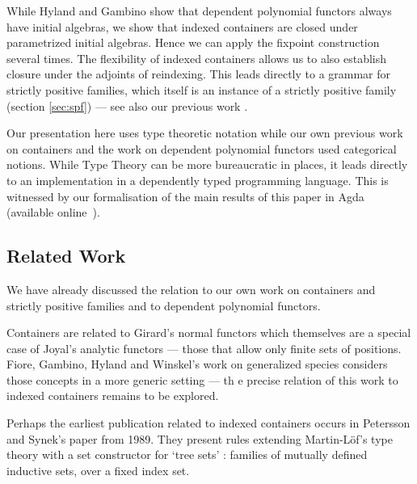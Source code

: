 \documentclass[10pt, conference, compsocconf]{IEEEtran}
\begin{document}
While Hyland and Gambino \cite{HylandGambino} show that dependent polynomial 
functors always
have initial algebras, we show that indexed containers are closed under 
parametrized initial algebras. Hence we can apply the fixpoint
construction several times. The flexibility of indexed
containers allows us to also establish closure under the adjoints of
reindexing. This leads directly to a grammar for strictly positive
families, which itself is an instance of a strictly positive family 
(section \ref{sec:spf}) --- see also our previous work \cite{alti:cats07,alti:jcats07}.

Our presentation here uses type theoretic notation while our own
previous work on containers and the work on dependent polynomial functors used
categorical notions. While Type Theory can be more bureaucratic in places, it
leads directly to an implementation in a dependently typed programming
language. This is witnessed by our formalisation of the main results
of this paper in Agda (available online~\cite{agdaform}).


\subsection*{Related Work}
\label{sec:related-work}

\noindent We have already discussed the relation to our own work on containers
and strictly positive families and to dependent polynomial functors.

Containers are related to Girard's normal functors \cite{GirardNormal} which
themselves are a special case of Joyal's analytic functors
\cite{JoyalA:fonaes} --- those that allow only finite sets of positions.
Fiore, Gambino, Hyland and Winskel's work on generalized species
\cite{fiore2008ccb} considers those concepts in a more generic setting ---
th e precise relation of this work to indexed containers remains to be
explored.

\noindent Perhaps the earliest publication related to indexed containers
occurs in Petersson and Synek's paper
\cite{PS89} from 1989. They present rules extending Martin-L{\"o}f's
type theory with a set constructor for `tree sets' : families of
mutually defined inductive sets, over a fixed index set.
\end{document}
